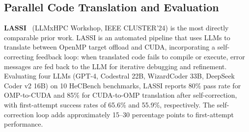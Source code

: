 \documentclass{article}
\begin{document}


\subsection{Parallel Code Translation and Evaluation}
\label{sec:parallel-translation}

\textbf{LASSI}~\cite{LASSI2024} (LLMxHPC Workshop, IEEE CLUSTER'24) is the most directly comparable prior work. LASSI is an automated pipeline that uses LLMs to translate between OpenMP target offload and CUDA, incorporating a self-correcting feedback loop: when translated code fails to compile or execute, error messages are fed back to the LLM for iterative debugging and refinement. Evaluating four LLMs (GPT-4, Codestral 22B, WizardCoder 33B, DeepSeek Coder v2 16B) on 10 HeCBench benchmarks, LASSI reports 80\% pass rate for OMP-to-CUDA and 85\% for CUDA-to-OMP translation after self-correction, with first-attempt success rates of 65.6\% and 55.9\%, respectively. The self-correction loop adds approximately 15--30 percentage points to first-attempt performance.
\end{document}
